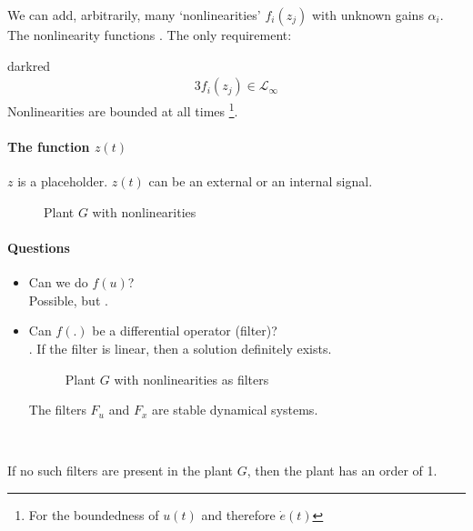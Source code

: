 

We can add, arbitrarily, many `nonlinearities' $f_i(z_j)$ with
unknown gains $\alpha_i$. The nonlinearity functions
.
The only requirement:
\begin{conclusion}{darkred}
\begin{alignat*}{3}
f_i(z_j) \in \mathcal{L}_\infty
\end{alignat*}
Nonlinearities are bounded at all times%
    \footnote{For the boundedness of $u(t)$ and therefore $\dot{e}(t)$}.
\end{conclusion}

\paragraph{The function $z(t)$} $z$ is a placeholder. $z(t)$
can be an external or an internal signal.
\begin{figure}[H]
    \centering
    
    \caption{Plant $G$ with nonlinearities}
    \label{fig:nonlinearities}
\end{figure}

\paragraph{Questions}
\begin{itemize}
\item Can we do $f(u)$?\\
    Possible, but .
\item Can $f(.)$ be a differential operator (filter)?\\
    . If the filter is linear, then a solution
    definitely exists.
    \begin{figure}[H]
        \centering
        
        \caption{Plant $G$ with nonlinearities as filters}
        \label{fig:nonlin-filter}
    \end{figure}
    The filters $F_u$ and  $F_x$ are stable dynamical systems.
\end{itemize}~

If no such filters are present in the plant $G$,
then the plant has an order of 1.\\

